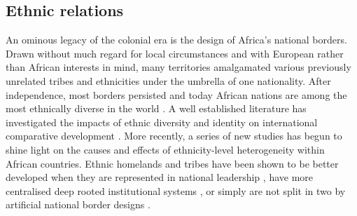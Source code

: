 \documentclass[11pt, oneside]{article}   	%
\begin{document}
\subsection{Ethnic relations}
An ominous legacy of the colonial era is the design of Africa's national borders. Drawn without much regard for local circumstances and with European rather than African interests in mind, many territories amalgamated various previously unrelated tribes and ethnicities under the umbrella of one nationality. After independence, most borders persisted and today African nations are among the most ethnically diverse in the world \citep{Alesina_Ethnicinequality_2016}. A well established literature has investigated the impacts of ethnic diversity and identity on international comparative development \citep{Easterly_AfricaGrowthTragedy_1997,Alesina_EthnicDiversityEconomic_2005,gennaioli_modern_2007,Alesina_Ethnicinequality_2016}. More recently, a series of new studies has begun to shine light on the causes and effects of ethnicity-level heterogeneity within African countries. Ethnic homelands and tribes have been shown to be better developed when they are represented in national leadership \citep{Franck_DoesLeaderEthnicity_2012}, have more centralised deep rooted institutional systems \citep{Michalopoulos_PreColonialEthnicInstitutions_2013}, or simply are not split in two by artificial national border designs \citep{Michalopoulos_LongRunEffectsScramble_2016}.
\end{document}

